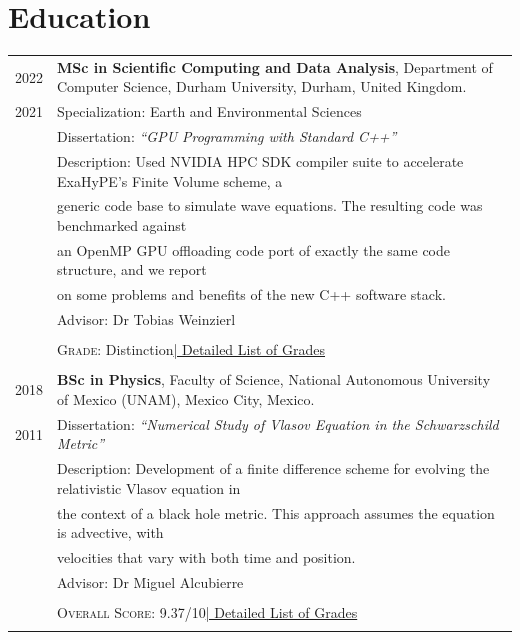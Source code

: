 \documentclass[a4paper,10pt]{article} %
\begin{document}
\section{Education}
\bigskip
\begin{tabular}{r|p{14.5cm}}	
	
	\textsc{2022} & \textbf{MSc in Scientific Computing and Data Analysis}, Department of Computer Science, Durham University, \small Durham, United Kingdom.\\
	\textsc{2021} & Specialization: Earth and Environmental Sciences\\
	& Dissertation: \emph{``GPU Programming with Standard C++''}\\ 
	& \small Description: Used NVIDIA HPC SDK compiler suite to accelerate ExaHyPE's Finite Volume scheme, a\\
	&\hspace{1.7cm} \small generic code base to simulate wave equations. The resulting code was benchmarked against\\
	&\hspace{1.7cm} an OpenMP GPU offloading code port of exactly the same code structure, and we report\\
	&\hspace{1.7cm} on some problems and benefits of the new C++ software stack.\\
	& \small Advisor: Dr Tobias Weinzierl\\
	& \\
	&\normalsize \textsc{Grade}: Distinction\hyperlink{grdsmsc}{\hfill | \footnotesize Detailed List of Grades}\\
	\multicolumn{2}{c}{}\\

	
	\textsc{2018} & \textbf{BSc in Physics}, Faculty of Science, National Autonomous University of Mexico (UNAM), \small Mexico City, Mexico.\\
	\textsc{2011} & Dissertation: \emph{``Numerical Study of Vlasov Equation in the Schwarzschild Metric''}\\
	&\small Description: Development of a finite difference scheme for evolving the relativistic Vlasov equation in\\
	&\hspace{1.7cm} \small the context of a black hole metric. This approach assumes the equation is advective, with\\
	&\hspace{1.7cm} \small velocities that vary with both time and position.\\
	& \small Advisor: Dr Miguel Alcubierre\\
	& \\
	&\normalsize \textsc{Overall Score}: 9.37/10\hyperlink{grdsbach}{\hfill | \footnotesize Detailed List of Grades}\\
	\multicolumn{2}{c}{}\\
	
	
\end{tabular}
\end{document}
